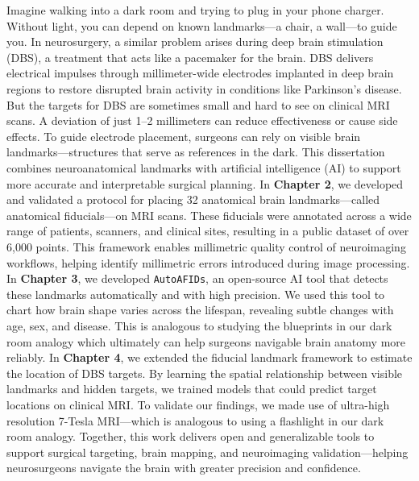 \onehalfspacing
Imagine walking into a dark room and trying to plug in your phone charger. Without light, you can depend on known landmarks—a chair, a wall—to guide you. In neurosurgery, a similar problem arises during deep brain stimulation (DBS), a treatment that acts like a pacemaker for the brain. DBS delivers electrical impulses through millimeter-wide electrodes implanted in deep brain regions to restore disrupted brain activity in conditions like Parkinson’s disease. But the targets for DBS are sometimes small and hard to see on clinical MRI scans. A deviation of just 1–2 millimeters can reduce effectiveness or cause side effects. To guide electrode placement, surgeons can rely on visible brain landmarks—structures that serve as references in the dark. This dissertation combines neuroanatomical landmarks with artificial intelligence (AI) to support more accurate and interpretable surgical planning. In \textbf{Chapter 2}, we developed and validated a protocol for placing 32 anatomical brain landmarks—called anatomical fiducials—on MRI scans. These fiducials were annotated across a wide range of patients, scanners, and clinical sites, resulting in a public dataset of over 6,000 points. This framework enables millimetric quality control of neuroimaging workflows, helping identify millimetric errors introduced during image processing. In \textbf{Chapter 3}, we developed \texttt{AutoAFIDs}, an open-source AI tool that detects these landmarks automatically and with high precision. We used this tool to chart how brain shape varies across the lifespan, revealing subtle changes with age, sex, and disease. This is analogous to studying the blueprints in our dark room analogy which ultimately can help surgeons navigable brain anatomy more reliably. In \textbf{Chapter 4}, we extended the fiducial landmark framework to estimate the location of DBS targets. By learning the spatial relationship between visible landmarks and hidden targets, we trained models that could predict target locations on clinical MRI. To validate our findings, we made use of ultra-high resolution 7-Tesla MRI—which is analogous to using a flashlight in our dark room analogy. Together, this work delivers open and generalizable tools to support surgical targeting, brain mapping, and neuroimaging validation—helping neurosurgeons navigate the brain with greater precision and confidence.

